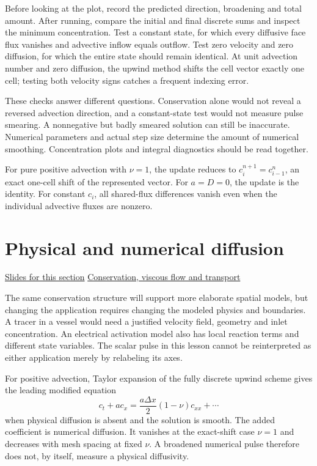 \documentclass[11pt,letterpaper]{article}
\theoremstyle{definition}\newtheorem{definition}{Definition}\newtheorem{example}{Example}
\numberwithin{equation}{section}
\begin{document}
Before looking at the plot, record the predicted direction, broadening and total amount. After running, compare the initial and final discrete sums and inspect the minimum concentration. Test a constant state, for which every diffusive face flux vanishes and advective inflow equals outflow. Test zero velocity and zero diffusion, for which the entire state should remain identical. At unit advection number and zero diffusion, the upwind method shifts the cell vector exactly one cell; testing both velocity signs catches a frequent indexing error.

These checks answer different questions. Conservation alone would not reveal a reversed advection direction, and a constant-state test would not measure pulse smearing. A nonnegative but badly smeared solution can still be inaccurate. Numerical parameters and actual step size determine the amount of numerical smoothing. Concentration plots and integral diagnostics should be read together.

For pure positive advection with $\nu=1$, the update reduces to $c_i^{n+1}=c_{i-1}^n$, an exact one-cell shift of the represented vector. For $a=D=0$, the update is the identity. For constant $c_i$, all shared-flux differences vanish even when the individual advective fluxes are nonzero.

\section{Physical and numerical diffusion}
\hypertarget{note-physical-and-numerical-diffusion}{}\label{note:physical-and-numerical-diffusion}
{\small \href{slides.html\#frame=numerical-diffusion\&step=1}{Slides for this section} \quad \href{../modules/cfd/index.html}{Conservation, viscous flow and transport}}\par
The same conservation structure will support more elaborate spatial models, but changing the application requires changing the modeled physics and boundaries. A tracer in a vessel would need a justified velocity field, geometry and inlet concentration. An electrical activation model also has local reaction terms and different state variables. The scalar pulse in this lesson cannot be reinterpreted as either application merely by relabeling its axes.

For positive advection, Taylor expansion of the fully discrete upwind scheme gives the leading modified equation
\[
 c_t+a c_x=\frac{a\Delta x}{2}(1-\nu)c_{xx}+\cdots
\]
when physical diffusion is absent and the solution is smooth. The added coefficient is numerical diffusion. It vanishes at the exact-shift case $\nu=1$ and decreases with mesh spacing at fixed $\nu$. A broadened numerical pulse therefore does not, by itself, measure a physical diffusivity.
\bigskip
\end{document}
